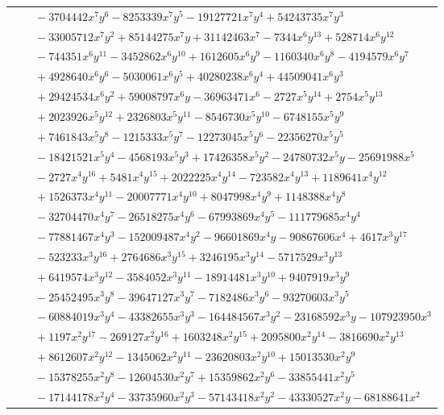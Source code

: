 \documentclass[11pt]{article}
\begin{document}
\begin{longtable}{@{}ll@{}}
 & $\quad -3704442x^{7}y^{6}-8253339x^{7}y^{5}-19127721x^{7}y^{4}+54243735x^{7}y^{3}$\\
 & $\quad -33005712x^{7}y^{2}+85144275x^{7}y+31142463x^{7}-7344x^{6}y^{13}+528714x^{6}y^{12}$\\
 & $\quad -744351x^{6}y^{11}-3452862x^{6}y^{10}+1612605x^{6}y^{9}-1160340x^{6}y^{8}-4194579x^{6}y^{7}$\\
 & $\quad +4928640x^{6}y^{6}-5030061x^{6}y^{5}+40280238x^{6}y^{4}+44509041x^{6}y^{3}$\\
 & $\quad +29424534x^{6}y^{2}+59008797x^{6}y-36963471x^{6}-2727x^{5}y^{14}+2754x^{5}y^{13}$\\
 & $\quad +2023926x^{5}y^{12}+2326803x^{5}y^{11}-8546730x^{5}y^{10}-6748155x^{5}y^{9}$\\
 & $\quad +7461843x^{5}y^{8}-1215333x^{5}y^{7}-12273045x^{5}y^{6}-22356270x^{5}y^{5}$\\
 & $\quad -18421521x^{5}y^{4}-4568193x^{5}y^{3}+17426358x^{5}y^{2}-24780732x^{5}y-25691988x^{5}$\\
 & $\quad -2727x^{4}y^{16}+5481x^{4}y^{15}+2022225x^{4}y^{14}-723582x^{4}y^{13}+1189641x^{4}y^{12}$\\
 & $\quad +1526373x^{4}y^{11}-20007771x^{4}y^{10}+8047998x^{4}y^{9}+1148388x^{4}y^{8}$\\
 & $\quad -32704470x^{4}y^{7}-26518275x^{4}y^{6}-67993869x^{4}y^{5}-111779685x^{4}y^{4}$\\
 & $\quad -77881467x^{4}y^{3}-152009487x^{4}y^{2}-96601869x^{4}y-90867606x^{4}+4617x^{3}y^{17}$\\
 & $\quad -523233x^{3}y^{16}+2764686x^{3}y^{15}+3246195x^{3}y^{14}-5717529x^{3}y^{13}$\\
 & $\quad +6419574x^{3}y^{12}-3584052x^{3}y^{11}-18914481x^{3}y^{10}+9407919x^{3}y^{9}$\\
 & $\quad -25452495x^{3}y^{8}-39647127x^{3}y^{7}-7182486x^{3}y^{6}-93270603x^{3}y^{5}$\\
 & $\quad -60884019x^{3}y^{4}-43382655x^{3}y^{3}-164484567x^{3}y^{2}-23168592x^{3}y-107923950x^{3}$\\
 & $\quad +1197x^{2}y^{17}-269127x^{2}y^{16}+1603248x^{2}y^{15}+2095800x^{2}y^{14}-3816690x^{2}y^{13}$\\
 & $\quad +8612607x^{2}y^{12}-1345062x^{2}y^{11}-23620803x^{2}y^{10}+15013530x^{2}y^{9}$\\
 & $\quad -15378255x^{2}y^{8}-12604530x^{2}y^{7}+15359862x^{2}y^{6}-33855441x^{2}y^{5}$\\
 & $\quad -17144178x^{2}y^{4}-33735960x^{2}y^{3}-57143418x^{2}y^{2}-43330527x^{2}y-68188641x^{2}$\\

\end{longtable}
\end{document}
